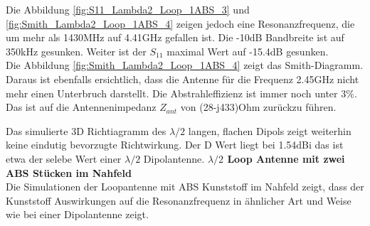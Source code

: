 Die Abbildung \ref{fig:S11_Lambda2_Loop_1ABS_3} und \ref{fig:Smith_Lambda2_Loop_1ABS_4} zeigen jedoch eine Resonanzfrequenz, die um mehr als 1430MHz auf 4.41GHz gefallen ist. Die -10dB Bandbreite ist auf 350kHz gesunken. Weiter ist der $S_{11}$ maximal Wert auf -15.4dB gesunken.\\
Die Abbildung \ref{fig:Smith_Lambda2_Loop_1ABS_4} zeigt das Smith-Diagramm. Daraus ist ebenfalls ersichtlich, dass die Antenne für die Frequenz 2.45GHz nicht mehr einen Unterbruch darstellt. Die Abstrahleffizienz ist immer noch unter $3\%$. Das ist auf die Antennenimpedanz $Z_{ant}$ von (28-j433)Ohm zurückzu führen.


Das simulierte 3D Richtiagramm des $\lambda/2$ langen, flachen Dipols zeigt weiterhin keine eindutig bevorzugte Richtwirkung. Der D Wert liegt bei 1.54dBi das ist etwa der selebe Wert einer $\lambda/2$ Dipolantenne. 
\newpage
\textbf{$\lambda/2$ Loop Antenne mit zwei ABS Stücken im Nahfeld}\\
Die Simulationen der Loopantenne mit ABS Kunststoff im Nahfeld  zeigt, dass der Kunststoff  Auswirkungen auf die Resonanzfrequenz in ähnlicher Art und Weise wie bei einer Dipolantenne zeigt.\\

